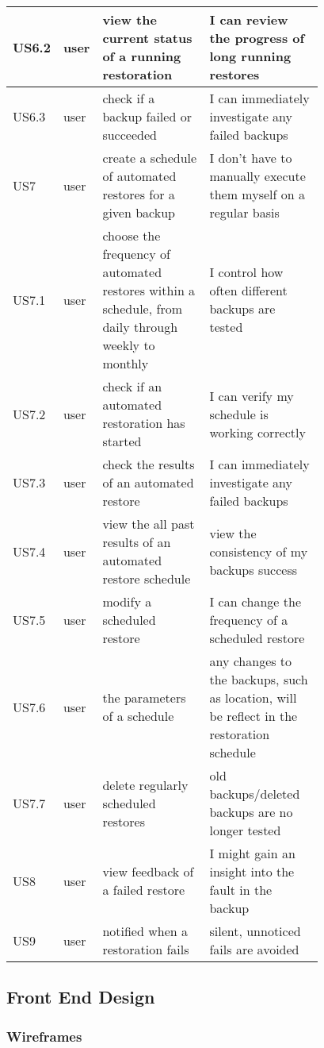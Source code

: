 \begin{table}[H]
\begin{tabular}{|l|l|p{0.39\linewidth}|p{0.39\linewidth}|}
				US6.2 & user & view the current status of a running restoration & I can review the progress of long running restores \\ \hline
				US6.3 & user & check if a backup failed or succeeded & I can immediately investigate any failed backups \\ \hline
				US7 & user & create a schedule of automated restores for a given backup & I don't have to manually execute them myself on a regular basis \\ \hline
				US7.1 & user & choose the frequency of automated restores within a schedule, from daily through weekly to monthly & I control how often different backups are tested \\ \hline
				US7.2 & user & check if an automated restoration has started & I can verify my schedule is working correctly \\ \hline
				US7.3 & user & check the results of an automated restore & I can immediately investigate any failed backups \\ \hline
				US7.4 & user & view the all past results of an automated restore schedule & view the consistency of my backups success \\ \hline
				US7.5 & user & modify a scheduled restore & I can change the frequency of a scheduled restore \\ \hline
				US7.6 & user & the parameters of a schedule & any changes to the backups, such as location, will be reflect in the restoration schedule \\ \hline
				US7.7 & user & delete regularly scheduled restores & old backups/deleted backups are no longer tested \\ \hline 
				US8 & user & view feedback of a failed restore & I might gain an insight into the fault in the backup \\ \hline
				US9 & user & notified when a restoration fails & silent, unnoticed fails are avoided \\ \hline
			\end{tabular}
			\label{table:user-stories}
		\end{table}
		

        
	\subsection{Front End Design}
	\subsubsection{Wireframes}
	
